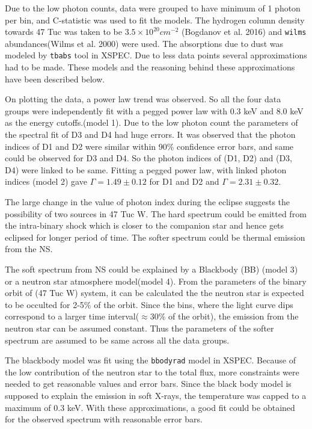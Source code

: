 \documentclass[a4paper,fleqn,usenatbib]{mnras}
\begin{document}
Due to the low photon counts, data were grouped to have minimum of 1 photon per bin, and C-statistic was used to fit the models.
The hydrogen column density towards 47 Tuc was taken to be $3.5 \times
10^{20} cm^{-2}$ (Bogdanov et al. 2016) and \texttt{wilms} abundances(Wilms et al. 2000) were used. The absorptions due to dust was modeled by \texttt{tbabs} tool in XSPEC.
Due to less data points several approximations had to be made. These models and the reasoning
behind these approximations have been described below.

On plotting the data, a power law trend was observed. So all the four data groups were independently fit with a pegged power law with
0.3 keV and 8.0 keV as the energy cutoffs.(model 1). Due to the low photon count the parameters of the spectral fit of D3 and D4
had huge errors. It was observed that the photon indices of D1 and D2 were similar within 90\% confidence error bars, and same could be 
observed for D3 and D4. So the photon indices of (D1, D2) and (D3, D4) were linked to be same. Fitting a pegged power law, with linked
photon indices (model 2) gave $\Gamma = 1.49 \pm 0.12$ for D1 and D2 and $\Gamma = 2.31 \pm 0.32$. 

The large change in the value of photon index during the eclipse suggests the possibility of two sources in 47 Tuc W. The hard spectrum could be emitted from the intra-binary shock which is closer to the companion star and hence gets eclipsed for longer period of time. The softer spectrum could be thermal emission from the NS.

The soft spectrum from NS could be explained by a Blackbody (BB) (model 3) or a neutron star atmosphere model(model 4). From the parameters 
of the binary orbit of (47 Tuc W) system, it can be calculated the the neutron star is expected to be occulted for 2-5\% of the orbit.
Since the bins, where the light curve dips correspond to a larger time interval($\approx 30\%$ of the orbit), the emission from the neutron star can be assumed constant.
Thus the parameters of the softer spectrum are assumed to be same across all the data groups. 

The blackbody model was fit using the \texttt{bbodyrad} model in XSPEC. Because of the low contribution of the neutron star to the total flux, more constraints were needed to get reasonable values and error bars. Since the black body model is supposed to explain the emission in soft X-rays, the temperature was capped to a maximum of 0.3 keV. With these approximations, a good fit could be obtained for the observed spectrum with reasonable error bars.
\end{document}
